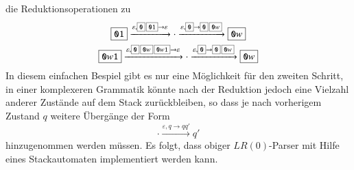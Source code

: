 die Reduktionsoperationen zu
\begin{gather*}
\boxed{\texttt{01}}
\xrightarrow{\varepsilon,\scalebox{0.7}{\boxed{\texttt{0}}\,\boxed{\texttt{01}}}\to\varepsilon}
\cdot
\xrightarrow{\varepsilon,\scalebox{0.7}{\boxed{\texttt{0}}}\to\scalebox{0.7}{\boxed{\texttt{0}}\,\boxed{\texttt{0}w}}}
\boxed{\texttt{0}w}
\\
\boxed{\texttt{0}w\texttt{1}}
\xrightarrow{\varepsilon,\scalebox{0.7}{\boxed{\texttt{0}}\,\boxed{\texttt{0}w}\,\boxed{\texttt{0}w\texttt{1}}}\to\varepsilon}
\cdot
\xrightarrow{\varepsilon,\scalebox{0.7}{\boxed{\texttt{0}}}\to\scalebox{0.7}{\boxed{\texttt{0}}\,\boxed{\texttt{0}w}}}
\boxed{\texttt{0}w}
\end{gather*}
In diesem einfachen Bespiel gibt es nur eine Möglichkeit für den zweiten
Schritt, in einer komplexeren Grammatik könnte nach der Reduktion jedoch
eine Vielzahl anderer Zustände auf dem Stack zurückbleiben, so dass je
nach vorherigem Zustand $q$ weitere Übergänge der Form
\[
\cdot\xrightarrow{\varepsilon,q\to q q'}q'
\]
hinzugenommen werden müssen.
Es folgt, dass obiger $LR(0)$-Parser mit
Hilfe eines Stackautomaten implementiert werden kann.

